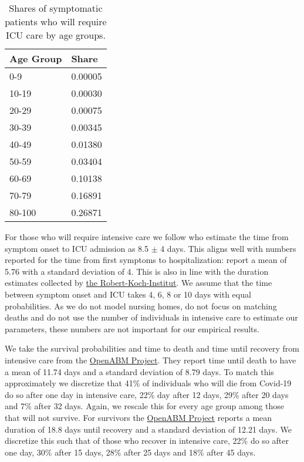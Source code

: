 \begin{table}[tb]
    \caption{Shares of symptomatic patients who will require ICU care by age groups.}
    \label{tab:symptomatic-to-ICU}
    \centering

    \begin{tabular}{ll}
        \toprule
        Age Group & Share \\
        \midrule
        0-9 & 0.00005 \\
        10-19 & 0.00030 \\
        20-29 & 0.00075 \\
        30-39 & 0.00345 \\
        40-49 & 0.01380 \\
        50-59 & 0.03404 \\
        60-69 & 0.10138 \\
        70-79 & 0.16891 \\
        80-100 & 0.26871 \\
        \bottomrule
    \end{tabular}


\end{table}

For those who will require intensive care we follow \citet{Chen2020} who estimate the
time from symptom onset to ICU admission as 8.5 $\pm$ 4 days. This aligns well with
numbers reported for the time from first symptoms to hospitalization:
\citet{Gaythorpe2020} report a mean of 5.76 with a standard deviation of 4. This is also
in line with the duration estimates collected by
\href{https://www.rki.de/DE/Content/InfAZ/N/Neuartiges_Coronavirus/Steckbrief.html#doc13776792bodyText16}{the
Robert-Koch-Institut}. We assume that the time between symptom onset and ICU takes 4, 6,
8 or 10 days with equal probabilities. As we do not model nursing homes, do not focus on
matching deaths and do not use the number of individuals in intensive care to estimate
our parameters, these numbers are not important for our empirical results.



We take the survival probabilities and time to death and time until recovery from
intensive care from the \href{https://tinyurl.com/y5owhyts}{OpenABM Project}. They report
time until death to have a mean of 11.74 days and a standard deviation of 8.79 days. To
match this approximately we discretize that 41\% of individuals who will die from
Covid-19 do so after one day in intensive care, 22\% day after 12 days, 29\% after 20
days and 7\% after 32 days. Again, we rescale this for every age group among those that
will not survive. For survivors the \href{https://tinyurl.com/y5owhyts}{OpenABM Project}
reports a mean duration of 18.8 days until recovery and a standard deviation of 12.21
days. We discretize this such that of those who recover in intensive care, 22\% do so
after one day, 30\% after 15 days, 28\% after 25 days and 18\% after 45 days.
